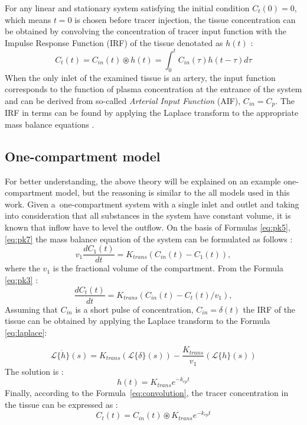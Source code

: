 For any linear and stationary system satisfying the 
initial condition $C_t(0) = 0$, which means $t = 0$ is chosen before tracer injection,
the tissue concentration can be obtained by convolving the concentration of tracer input function with the Impulse Response Function (IRF) of the tissue denotated as $h(t)$ \cite{sourbron2011scope}: 
\begin{equation}
	\label{eq:convolution}
	C_{t}(t) = C_{in}(t)\circledast h(t) = \int_{0}^{t}C_{in}(\tau)h(t-\tau)d\tau 
\end{equation}
When the only inlet of the examined tissue is an artery, the input function corresponds to the function of plasma concentration at the entrance of the system and can be derived from so-called \textit{Arterial Input Function} (AIF), $C_{in} = C_{p}$. The IRF in terms can be found by applying the Laplace transform to the appropriate mass balance equations \cite{thesis}.
\newpage

\subsection{One-compartment model}
For better understanding, the above theory will be explained on an example one-compartment model, but the reasoning is similar to the all models used in this work. Given a~one-compartment system with a single inlet and outlet and taking into consideration that all substances in the system have constant volume, it is known that inflow have to level the outflow. On the basis of Formulas \ref{eq:pk5}, \ref{eq:pk7} the mass balance equation of the system can be formulated as follows \cite{thesis}:
\begin{equation}
v_1\frac{dC_1(t)}{dt} = K_{trans}(C_{in}(t)-C_1(t)),
\end{equation}
where the $v_1$ is the fractional volume of the compartment. From the Formula \ref{eq:pk3} \cite{thesis}:
\begin{equation}
\frac{dC_t(t)}{dt} = K_{trans}(C_{in}(t)-C_t(t)/v_1),
\label{eq:laplace}
\end{equation}
Assuming that $C_{in}$ is a short pulse of concentration, $C_{in}=\delta(t)$ the IRF of the tissue can be obtained by applying the Laplace transform to the Formula \ref{eq:laplace}: 

\begin{equation}
\mathcal{L}\{\dot{h}\}(s) = K_{trans}(\mathcal{L}\{\delta\}(s)) - \frac{K_{trans}}{v_1}(\mathcal{L}\{h\}(s))
\end{equation}
The solution is \cite{thesis}:
\begin{equation}
h(t) = K_{trans}e^{-k_{ep}t}
\end{equation}
Finally, according to the Formula~\ref{eq:convolution}, the tracer concentration in the tissue can be expressed as \cite{thesis}:
\begin{equation}
	C_{t}(t) = C_{in}(t)\circledast  K_{trans}e^{-k_{ep}t} 
\end{equation}


